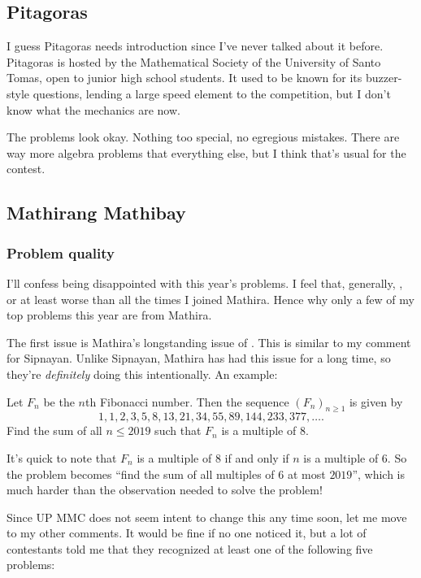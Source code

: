 \documentclass[11pt,paper=letter]{scrartcl}
\begin{document}
\subsection{Pitagoras}

I guess Pitagoras needs introduction since I've never talked about it before. Pitagoras is hosted by the Mathematical Society of the University of Santo Tomas, open to junior high school students. It used to be known for its buzzer-style questions, lending a large speed element to the competition, but I don't know what the mechanics are now.

The problems look okay. Nothing too special, no egregious mistakes. There are way more algebra problems that everything else, but I think that's usual for the contest. 

\subsection{Mathirang Mathibay}

\subsubsection*{Problem quality}

I'll confess being disappointed with this year's problems. I feel that, generally, , or at least worse than all the times I joined Mathira. Hence why only a few of my top problems this year are from Mathira.

The first issue is Mathira's longstanding issue of . This is similar to my comment for Sipnayan. Unlike Sipnayan, Mathira has had this issue for a long time, so they're \emph{definitely} doing this intentionally. An example:

\begin{probboxed}
  [Eliminations D4] Let $F_n$ be the $n$th Fibonacci number. Then the sequence $(F_n)_{n\ge 1}$ is given by
  $$1, 1, 2, 3, 5, 8, 13, 21, 34, 55, 89, 144, 233, 377, \ldots.$$
  Find the sum of all $n \le 2019$ such that $F_n$ is a multiple of $8$.
\end{probboxed}

It's quick to note that $F_n$ is a multiple of $8$ if and only if $n$ is a multiple of $6$. So the problem becomes ``find the sum of all multiples of $6$ at most $2019$'', which is much harder than the observation needed to solve the problem! 

Since UP MMC does not seem intent to change this any time soon, let me move to my other comments.  It would be fine if no one noticed it, but a lot of contestants told me that they recognized at least one of the following five problems:
\end{document}
